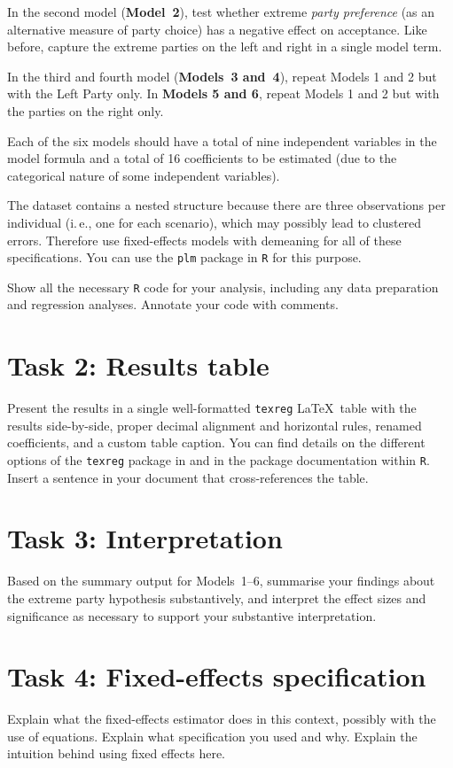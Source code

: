 \documentclass[a4paper,11pt]{article}
\begin{document}
In the second model (\textbf{Model~2}), test whether extreme \emph{party preference} (as an alternative measure of party choice) has a negative effect on acceptance. Like before, capture the extreme parties on the left and right in a single model term.

In the third and fourth model (\textbf{Models~3 and~4}), repeat Models 1 and 2 but with the Left Party only. In \textbf{Models 5 and 6}, repeat Models 1 and 2 but with the parties on the right only.

Each of the six models should have a total of nine independent variables in the model formula and a total of 16 coefficients to be estimated (due to the categorical nature of some independent variables).

The dataset contains a nested structure because there are three observations per individual (i.\,e., one for each scenario), which may possibly lead to clustered errors. Therefore use fixed-effects models with demeaning for all of these specifications. You can use the \texttt{plm} package in \texttt{R} for this purpose.

Show all the necessary \texttt{R} code for your analysis, including any data preparation and regression analyses. Annotate your code with comments.

\section*{Task 2: Results table}
Present the results in a single well-formatted \texttt{texreg} \LaTeX\ table with the results side-by-side, proper decimal alignment and horizontal rules, renamed coefficients, and a custom table caption. You can find details on the different options of the \texttt{texreg} package in \citet{leifeld2013texreg} and in the package documentation within \texttt{R}. Insert a sentence in your document that cross-references the table.

\section*{Task 3: Interpretation}
Based on the summary output for Models~1--6, summarise your findings about the extreme party hypothesis substantively, and interpret the effect sizes and significance as necessary to support your substantive interpretation.

\section*{Task 4: Fixed-effects specification}
Explain what the fixed-effects estimator does in this context, possibly with the use of equations. Explain what specification you used and why. Explain the intuition behind using fixed effects here.
\end{document}
